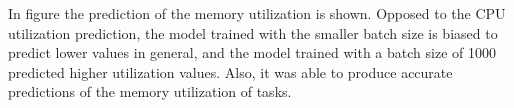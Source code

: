  In figure 
  the prediction of the memory utilization is shown.
  Opposed to the CPU utilization prediction, the model trained with the smaller batch size is biased to predict lower values in general, and the model trained with a batch size of 1000 predicted higher utilization values. Also, it was able to produce accurate predictions of the memory utilization of tasks.
  

  


    




